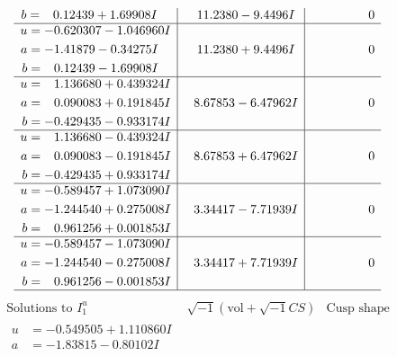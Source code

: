\documentclass[1p]{elsarticle_modified}
\theoremstyle{definition}
\newcommand{\I}{\sqrt{-1}}
\begin{document}
$$\begin{array}{c|c|c}
\begin{aligned}
b &= \phantom{-}0.12439 + 1.69908 I\end{aligned}
 & \phantom{-}11.2380 - 9.4496 I & \phantom{-0.000000 } 0 \\ \hline\begin{aligned}
u &= -0.620307 - 1.046960 I \\
a &= -1.41879 - 0.34275 I \\
b &= \phantom{-}0.12439 - 1.69908 I\end{aligned}
 & \phantom{-}11.2380 + 9.4496 I & \phantom{-0.000000 } 0 \\ \hline\begin{aligned}
u &= \phantom{-}1.136680 + 0.439324 I \\
a &= \phantom{-}0.090083 + 0.191845 I \\
b &= -0.429435 - 0.933174 I\end{aligned}
 & \phantom{-}8.67853 - 6.47962 I & \phantom{-0.000000 } 0 \\ \hline\begin{aligned}
u &= \phantom{-}1.136680 - 0.439324 I \\
a &= \phantom{-}0.090083 - 0.191845 I \\
b &= -0.429435 + 0.933174 I\end{aligned}
 & \phantom{-}8.67853 + 6.47962 I & \phantom{-0.000000 } 0 \\ \hline\begin{aligned}
u &= -0.589457 + 1.073090 I \\
a &= -1.244540 + 0.275008 I \\
b &= \phantom{-}0.961256 + 0.001853 I\end{aligned}
 & \phantom{-}3.34417 - 7.71939 I & \phantom{-0.000000 } 0 \\ \hline\begin{aligned}
u &= -0.589457 - 1.073090 I \\
a &= -1.244540 - 0.275008 I \\
b &= \phantom{-}0.961256 - 0.001853 I\end{aligned}
 & \phantom{-}3.34417 + 7.71939 I & \phantom{-0.000000 } 0\\
 \hline 
 \end{array}$$\newpage$$\begin{array}{c|c|c}  
\text{Solutions to }I^u_{1}& \I (\text{vol} + \sqrt{-1}CS) & \text{Cusp shape}\\
 \hline 
\begin{aligned}
u &= -0.549505 + 1.110860 I \\
a &= -1.83815 - 0.80102 I \\

\end{aligned}
\end{array}$$
\end{document}
